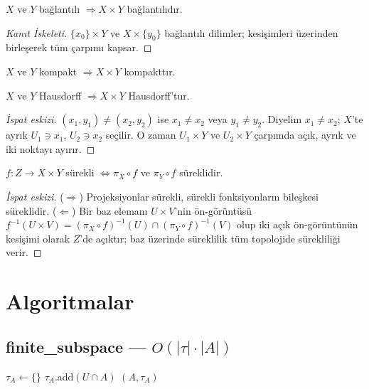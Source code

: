 \begin{theorem}
$X$ ve $Y$ bağlantılı $\Rightarrow X \times Y$ bağlantılıdır.
\begin{proof}[Kanıt İskeleti]
$\{x_0\} \times Y$ ve $X \times \{y_0\}$ bağlantılı dilimler; kesişimleri üzerinden birleşerek tüm çarpımı kapsar.
\end{proof}
\end{theorem}

\begin{theorem}[Tychonoff, $n=2$]
$X$ ve $Y$ kompakt $\Rightarrow X \times Y$ kompakttır.
\end{theorem}

\begin{theorem}
$X$ ve $Y$ Hausdorff $\Rightarrow X \times Y$ Hausdorff'tur.
\begin{proof}[İspat eskizi]
$(x_1,y_1) \ne (x_2,y_2)$ ise $x_1 \ne x_2$ veya $y_1 \ne y_2$. Diyelim
$x_1 \ne x_2$; $X$'te ayrık $U_1 \ni x_1$, $U_2 \ni x_2$ seçilir. O zaman
$U_1 \times Y$ ve $U_2 \times Y$ çarpımda açık, ayrık ve iki noktayı ayırır.
\end{proof}
\end{theorem}

\begin{theorem}
$f: Z \to X \times Y$ sürekli $\Leftrightarrow \pi_X \circ f$ ve $\pi_Y \circ f$ süreklidir.
\begin{proof}[İspat eskizi]
($\Rightarrow$) Projeksiyonlar sürekli, sürekli fonksiyonların bileşkesi
süreklidir. ($\Leftarrow$) Bir baz elemanı $U \times V$'nin ön-görüntüsü
$f^{-1}(U \times V) = (\pi_X \circ f)^{-1}(U) \cap (\pi_Y \circ f)^{-1}(V)$
olup iki açık ön-görüntünün kesişimi olarak $Z$'de açıktır; baz üzerinde
süreklilik tüm topolojide sürekliliği verir.
\end{proof}
\end{theorem}

\section{Algoritmalar}

\subsection{finite\_subspace — $O(|\tau| \cdot |A|)$}

\begin{algorithm}
\caption{Subspace$(X, \tau, A)$}
\begin{algorithmic}[1]
\State $\tau_A \leftarrow \{\}$
    \State $\tau_A$.add$(U \cap A)$
\EndFor
\State \Return $(A, \tau_A)$
\end{algorithmic}
\end{algorithm}

